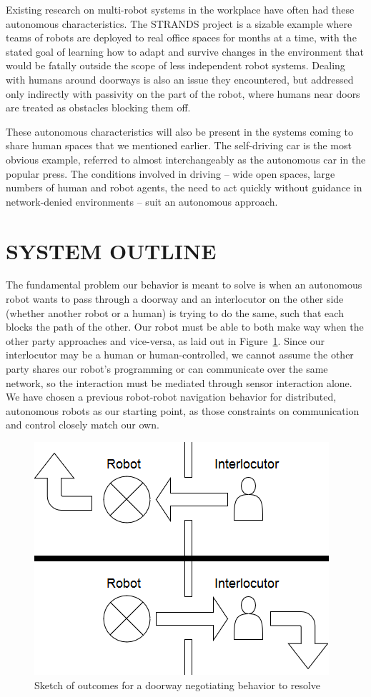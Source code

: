 \documentclass[letterpaper, 10 pt, conference]{ieeeconf}  %
\begin{document}
Existing research on multi-robot systems in the workplace have often had these autonomous characteristics. The STRANDS project\cite{c11} is a sizable example where teams of robots are deployed to real office spaces for months at a time, with the stated goal of learning how to adapt and survive changes in the environment that would be fatally outside the scope of less independent robot systems. Dealing with humans around doorways is also an issue they encountered, but addressed only indirectly with passivity on the part of the robot, where humans near doors are treated as obstacles blocking them off.

These autonomous characteristics will also be present in the systems coming to share human spaces that we mentioned earlier. The self-driving car is the most obvious example, referred to almost interchangeably as the autonomous car in the popular press\cite{c12}. The conditions involved in driving – wide open spaces, large numbers of human and robot agents, the need to act quickly without guidance in network-denied environments – suit an autonomous approach.


\section{SYSTEM OUTLINE}

The fundamental problem our behavior is meant to solve is when an autonomous robot wants to pass through a doorway and an interlocutor on the other side (whether another robot or a human) is trying to do the same, such that each blocks the path of the other. Our robot must be able to both make way when the other party approaches and vice-versa, as laid out in Figure~\ref{fig:Wireframe}. Since our interlocutor may be a human or human-controlled, we cannot assume the other party shares our robot’s programming or can communicate over the same network, so the interaction must be mediated through sensor interaction alone. We have chosen a previous robot-robot navigation behavior for distributed, autonomous robots as our starting point, as those constraints on communication and control closely match our own.

    \begin{figure}
      \centering
      \includegraphics{wireframe.png}
      \caption{Sketch of outcomes for a doorway negotiating behavior to resolve}
      \label{fig:Wireframe}
   \end{figure}
\end{document}
